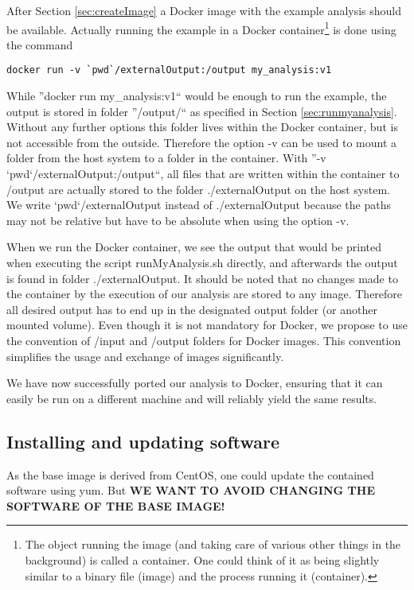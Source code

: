 \documentclass[a4paper, twoside, 11pt]{article}
\begin{document}
After Section \ref{sec:createImage} a Docker image with the example analysis should be available. 
Actually running the example in a Docker container\footnote{The object running the image 
(and taking care of various other things in the background) is called a container. 
One could think of it as being slightly similar to a binary file (image) and the process running it (container).} 
is done using the command 
\begin{lstlisting}[basicstyle=\ttfamily\small,upquote=true,columns=flexible,keepspaces=true,frame=single]
docker run -v `pwd`/externalOutput:/output my_analysis:v1
\end{lstlisting}
While ''docker run my\_analysis:v1``
would be enough to run the example, the output is stored in folder 
''/output/`` as specified in Section \ref{sec:runmyanalysis}.
Without any further options this folder lives within the Docker container, but is not accessible from the outside. 
Therefore the option -v can be used to mount a folder from the host system to a folder in the container. 
With ''-v `pwd`/externalOutput:/output``, all files that are written within the container to /output 
are actually stored to the folder ./externalOutput on the host system. 
We write `pwd`/externalOutput instead of ./externalOutput because the 
paths may not be relative but have to be absolute when using the option -v. 

When we run the Docker container, we see the output that would be printed when 
executing the script runMyAnalysis.sh directly, and afterwards the output is found in folder ./externalOutput. 
It should be noted that no changes made to the container by the execution of our analysis 
are stored to any image. 
Therefore all desired output has to end up in the designated output folder (or another mounted volume). 
Even though it is not mandatory for Docker, 
we propose to use the convention of /input and /output folders for Docker images. 
This convention simplifies the usage and exchange of images significantly. 

We have now successfully ported our analysis to Docker, ensuring that it can easily be run  
on a different machine and will reliably yield the same results. 



\subsection{Installing and updating software}
\label{sec:installSoftware}
As the base image is derived from CentOS, one could update the contained software using yum. 
But \textbf{WE WANT TO AVOID CHANGING THE SOFTWARE OF THE BASE IMAGE!}
\end{document}
